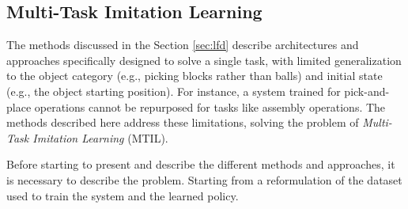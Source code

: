 \subsection{Multi-Task Imitation Learning}
\label{sec:occp_mtil}
The methods discussed in the Section \ref{sec:lfd} describe architectures and approaches specifically designed to solve a single task, with limited generalization to the object category (e.g., picking blocks rather than balls) and initial state (e.g., the object starting position). For instance, a system trained for pick-and-place operations cannot be repurposed for tasks like assembly operations. The methods described here address these limitations, solving the problem of \textit{Multi-Task Imitation Learning} (MTIL).

Before starting to present and describe the different methods and approaches, it is necessary to describe the problem. Starting from a reformulation of the dataset used to train the system and the learned policy.


